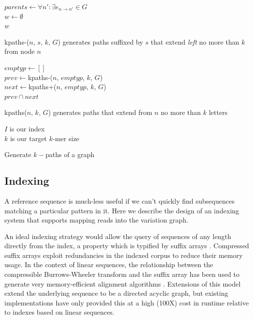\documentclass{article}
\begin{document}
\begin{function}[h!]
  \label{func:kpaths-}
  $parents \gets \forall n' : \exists e_{n \rightarrow n'} \in G$ \\
  $w \gets \emptyset$ \\
  \Return $w$
  \caption{kpaths-($n$, $s$, $k$, $G$) generates paths suffixed by $s$ that extend \emph{left} no more than $k$ from node $n$ }
\end{function}

\begin{function}[h!]
  \label{func:kpaths}
  $emptyp \gets []$ \\
  $prev \gets $kpaths-($n$, $emptyp$, $k$, $G$) \\
  $next \gets $kpaths+($n$, $emptyp$, $k$, $G$) \\
  \Return $prev \cap next$ 
  \caption{kpaths($n$, $k$, $G$) generates paths that extend from $n$ no more than $k$ letters }
\end{function}

\begin{algorithm}[h!]
  $I$ is our index \\
  $k$ is our target $k$-mer size \\
  \caption{
\label{alg:kpaths}
Generate $k-$paths of a graph
}
\end{algorithm}


\subsection{Indexing}

A reference sequence is much-less useful if we can't quickly find subsequences matching a particular pattern in it. Here we describe the design of an indexing system that supports mapping reads into the variation graph.

An ideal indexing strategy would allow the query of sequences of any length directly from the index, a property which is typified by suffix arrays \cite{puglisi2007taxonomy}. Compressed suffix arrays exploit redundancies in the indexed corpus to reduce their memory usage. In the context of linear sequences, the relationship between the compressible Burrows-Wheeler transform and the suffix array has been used to generate very memory-efficient alignment algorithms \cite{li2013aligning}. Extensions of this model extend the underlying sequence to be a directed acyclic graph, but existing implementations have only provided this at a high (100X) cost in runtime \cite{siren2011indexing, huang2013short} relative to indexes based on linear sequences.
\end{document}
